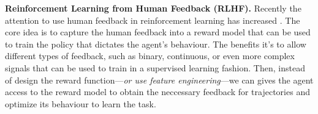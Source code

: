 
\noindent\textbf{Reinforcement Learning from Human Feedback (RLHF).} Recently the attention to use human feedback in reinforcement learning has increased \cite{kaufmann2023survey}. The core idea is to capture the human feedback into a reward model that can be used to train the policy that dictates the agent's behaviour. The benefits it's to allow different types of feedback, such as binary, continuous, or even more complex signals that can be used to train in a supervised learning fashion. Then, instead of design the reward function---\textit{or use feature engineering}---we can gives the agent access to the reward model to obtain the neccessary feedback for trajectories and optimize its behaviour to learn the task. \\


